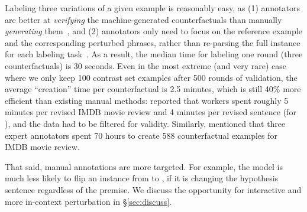 
Labeling three variations of a given example is reasonably easy, as (1) annotators are better at \emph{verifying} the machine-generated counterfactuals than manually \emph{generating} them~\cite{ribeiro2018sear}, and (2) annotators only need to focus on the reference example and the corresponding perturbed phrases, rather than re-parsing the full instance for each labeling task~\cite{Khashabi2020MoreBF}.
As a result, the median time for labeling one round (three counterfactuals) is 30 seconds.
Even in the most extreme (and very rare) case where we only keep 100 contrast set examples after 500 rounds of validation, the average ``creation'' time per counterfactual is 2.5 minutes, which is still 40\% more efficient than existing manual methods:
\citet{kaushik2019learning} reported that workers spent roughly 5 minutes per revised IMDB movie review and 4 minutes per revised sentence (for \nli), and the data had to be filtered for validity.
Similarly, \citet{gardner2020contrast} mentioned that three expert annotators spent 70 hours to create 588 counterfactual examples for IMDB movie review.



That said, manual annotations are more targeted. 
For example, the model is much less likely to flip an \nli instance from  to , if it is changing the hypothesis sentence regardless of the premise.
We discuss the opportunity for interactive and more in-context perturbation in \S\ref{sec:discuss}.


